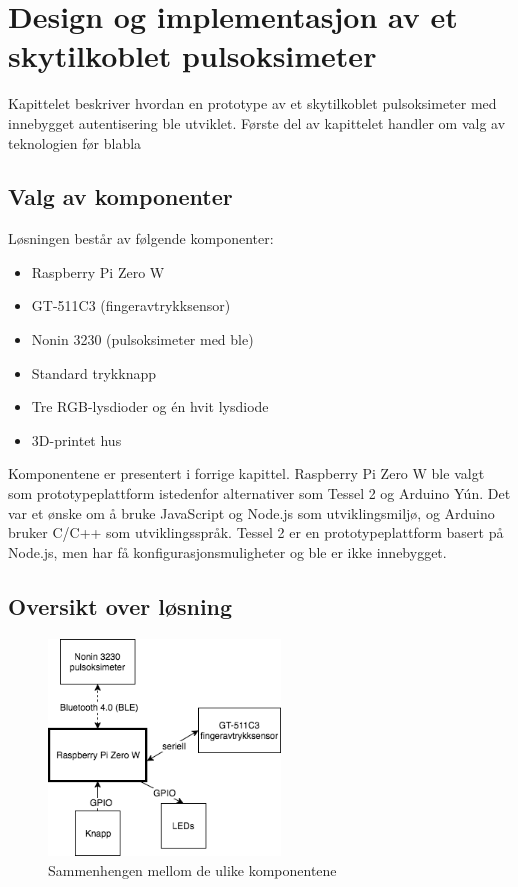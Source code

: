 \chapter{Design og implementasjon av et skytilkoblet pulsoksimeter}
\label{ch:implementation1}

Kapittelet beskriver hvordan en prototype av et skytilkoblet pulsoksimeter med innebygget autentisering ble utviklet.
Første del av kapittelet handler om valg av teknologien før blabla

\section{Valg av komponenter}
Løsningen består av følgende komponenter:

\begin{itemize}
  \item Raspberry Pi Zero W
  \item GT-511C3 (fingeravtrykksensor)
  \item Nonin 3230 (pulsoksimeter med \gls{ble})
  \item Standard trykknapp
  \item Tre RGB-lysdioder og én hvit lysdiode
  \item 3D-printet hus
\end{itemize}

Komponentene er presentert i forrige kapittel. Raspberry Pi Zero W ble valgt som prototypeplattform istedenfor
alternativer som Tessel 2 og Arduino Yún. Det var et ønske om å bruke JavaScript og Node.js som utviklingsmiljø, og Arduino
bruker C/C++ som utviklingsspråk. Tessel 2 er en prototypeplattform basert på Node.js, men har få konfigurasjonsmuligheter
og \gls{ble} er ikke innebygget.

\section{Oversikt over løsning}


\begin{figure}
\includegraphics[width=0.55\textwidth, center]{fig/prototype/oversiktlosning}
\caption{Sammenhengen mellom de ulike komponentene}
\label{fig:prototypeoversikt}
\end{figure}

